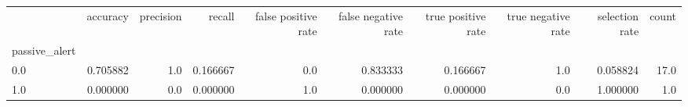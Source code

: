 \begin{tabular}{lrrrrrrrrr}
\toprule
{} &  accuracy &  precision &    recall &  false positive rate &  false negative rate &  true positive rate &  true negative rate &  selection rate &  count \\
passive\_alert &           &            &           &                      &                      &                     &                     &                 &        \\
\midrule
0.0           &  0.705882 &        1.0 &  0.166667 &                  0.0 &             0.833333 &            0.166667 &                 1.0 &        0.058824 &   17.0 \\
1.0           &  0.000000 &        0.0 &  0.000000 &                  1.0 &             0.000000 &            0.000000 &                 0.0 &        1.000000 &    1.0 \\
\bottomrule
\end{tabular}
